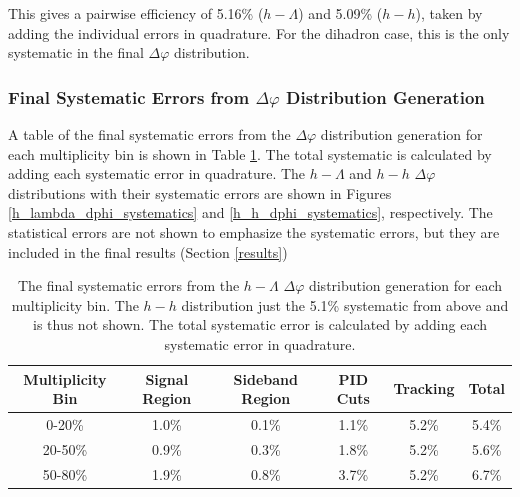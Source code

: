 \documentclass[ALICE,manyauthors]{ALICE_analysis_notes}
\begin{document}
This gives a pairwise efficiency of 5.16\% ($h-\Lambda$) and 5.09\% ($h-h$), taken by adding the individual errors in quadrature. For the dihadron case, this is the only systematic in the final $\Delta\varphi$ distribution.

\subsubsection{Final Systematic Errors from $\Delta\varphi$ Distribution Generation}
A table of the final systematic errors from the $\Delta\varphi$ distribution generation for each multiplicity bin is shown in Table \ref{dphi_systematics_table}. The total systematic is calculated by adding each systematic error in quadrature. The $h-\Lambda$ and $h-h$ $\Delta\varphi$ distributions with their systematic errors are shown in Figures \ref{h_lambda_dphi_systematics} and \ref{h_h_dphi_systematics}, respectively. The statistical errors are not shown to emphasize the systematic errors, but they are included in the final results (Section \ref{results})


\begin{table}[ht]
\centering
\begin{tabular}{|c|c|c|c|c||c|}
\hline
Multiplicity Bin & Signal Region & Sideband Region & PID Cuts & Tracking & Total \\
\hline
0-20\% & 1.0\% & 0.1\% & 1.1\% & 5.2\% & 5.4\% \\
20-50\% & 0.9\% & 0.3\% & 1.8\% & 5.2\% & 5.6\% \\
50-80\% & 1.9\% & 0.8\% & 3.7\% & 5.2\% & 6.7\% \\
\hline
\end{tabular}
\caption{The final systematic errors from the $h-\Lambda$ $\Delta\varphi$ distribution generation for each multiplicity bin. The $h-h$ distribution just the 5.1\% systematic from above and is thus not shown. The total systematic error is calculated by adding each systematic error in quadrature.}
\label{dphi_systematics_table}
\end{table}
\end{document}
